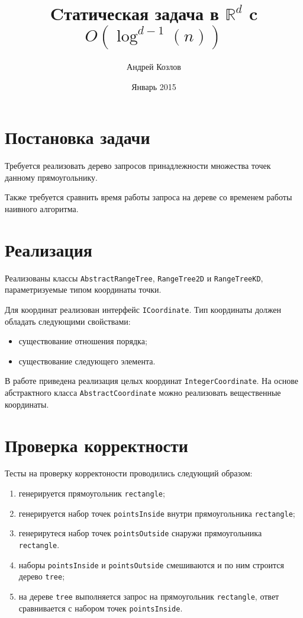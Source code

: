 \documentclass[12pt,a4paper]{article}
\begin{document}
\title{Cтатическая задача в $\mathbb{R}^d$ c $O(\log^{d-1}(n))$}
\author{Андрей Козлов}
\date{Январь 2015}

\maketitle

\section*{Постановка задачи}

Требуется реализовать дерево запросов принадлежности множества точек данному прямоугольнику.

Также требуется сравнить время работы запроса на дереве со временем работы наивного алгоритма.

\section*{Реализация}

Реализованы классы \texttt{AbstractRangeTree}, \texttt{RangeTree2D} и \texttt{RangeTreeKD}, параметризуемые типом координаты точки.

Для координат реализован интерфейс \texttt{ICoordinate}. Тип координаты должен обладать следующими свойствами:
\begin{itemize}
	\item существование отношения порядка;
	\item существование следующего элемента.
\end{itemize}

В работе приведена реализация целых координат \texttt{IntegerCoordinate}. На основе абстрактного класса \texttt{AbstractCoordinate} можно реализовать вещественные координаты.

\section*{Проверка корректности}

Тесты на проверку корректоности проводились следующий образом:
\begin{enumerate}
	\item генерируется прямоугольник \texttt{rectangle};
	\item генерируется набор точек \texttt{pointsInside} внутри прямоугольника \texttt{rectangle};
	\item генерирутеся набор точек \texttt{pointsOutside} снаружи прямоугольника \texttt{rectangle}.
	\item наборы \texttt{pointsInside} и \texttt{pointsOutside} смешиваются и по ним строится дерево \texttt{tree};
	\item на дереве \texttt{tree} выполняется запрос на прямоугольник \texttt{rectangle}, ответ сравнивается с набором точек \texttt{pointsInside}.
\end{enumerate}
\end{document}
